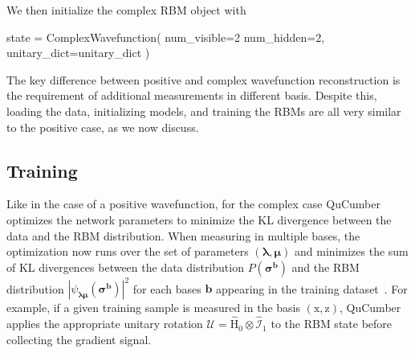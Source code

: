 \documentclass[submission, Phys, hidelnks]{SciPost}
\begin{document}
We then initialize the complex RBM object with
\begin{python}
state = ComplexWavefunction(
   num_visible=2 num_hidden=2, unitary_dict=unitary_dict
)
\end{python}
The key difference between positive and complex wavefunction reconstruction is
the requirement of additional measurements in different basis. Despite this,
loading the data, initializing models, and training the RBMs are all very
similar to the positive case, as we now discuss.

\subsection{Training}
Like in the case of a positive wavefunction, for the complex case
QuCumber optimizes the network parameters to minimize the KL divergence between
the data and the RBM distribution. When measuring in multiple bases, the
optimization now runs over the set of parameters $(\bm{\lambda},\bm{\mu})$ and
minimizes the sum of KL divergences between the data distribution
$P(\bm{\sigma}^{\bm{b}})$ and the RBM distribution
 $|\psi_{\bm{\lambda\mu}}(\bm{\sigma}^{\bm{b}})|^2$ for each bases $\bm{b}$
 appearing in the training dataset~\cite{torlai_neural-network_2018}.
For example, if a given training sample is measured in the basis
 $(\mathrm{x},\mathrm{z})$, QuCumber applies the appropriate unitary
 rotation $\bm{\mathcal{U}}=\hat{\mathrm{H}}_0\otimes\hat{\mathcal{I}}_1$ to
 the RBM state before collecting the gradient signal.
\end{document}
